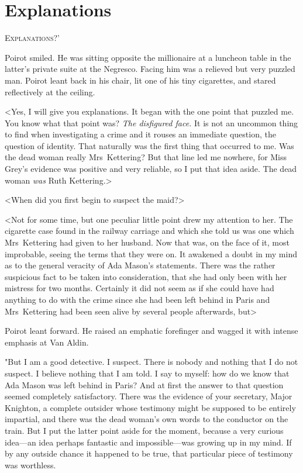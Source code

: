 \chapter{Explanations}



\lettrine[ante=`]{E}{xplanations?}'

\zz
Poirot smiled. He was sitting opposite the millionaire at a luncheon table in the latter's private suite at the Negresco. Facing him was a relieved but very puzzled man. Poirot leant back in his chair, lit one of his tiny cigarettes, and stared reflectively at the ceiling.

<Yes, I will give you explanations. It began with the one point that puzzled me. You know what that point was? \emph{The disfigured face.} It is not an uncommon thing to find when investigating a crime and it rouses an immediate question, the question of identity. That naturally was the first thing that occurred to me. Was the dead woman really Mrs~Kettering? But that line led me nowhere, for Miss Grey's evidence was positive and very reliable, so I put that idea aside. The dead woman \emph{was} Ruth Kettering.>

<When did you first begin to suspect the maid?>

<Not for some time, but one peculiar little point drew my attention to her. The cigarette case found in the railway carriage and which she told us was one which Mrs~Kettering had given to her husband. Now that was, on the face of it, most improbable, seeing the terms that they were on. It awakened a doubt in my mind as to the general veracity of Ada Mason's statements. There was the rather suspicious fact to be taken into consideration, that she had only been with her mistress for two months. Certainly it did not seem as if she could have had anything to do with the crime since she had been left behind in Paris and Mrs~Kettering had been seen alive by several people afterwards, but\longdash>

Poirot leant forward. He raised an emphatic forefinger and wagged it with intense emphasis at Van Aldin.

"But I am a good detective. I suspect. There is nobody and nothing that I do not suspect. I believe nothing that I am told. I say to myself: how do we know that Ada Mason was left behind in Paris? And at first the answer to that question seemed completely satisfactory. There was the evidence of your secretary, Major Knighton, a complete outsider whose testimony might be supposed to be entirely impartial, and there was the dead woman's own words to the conductor on the train. But I put the latter point aside for the moment, because a very curious idea—an idea perhaps fantastic and impossible—was growing up in my mind. If by any outside chance it happened to be true, that particular piece of testimony was worthless.

